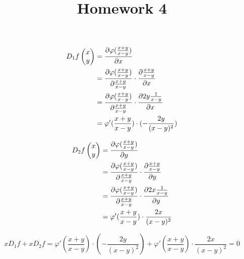 \documentclass{homework}
\title{Homework 4}
\begin{document}
\maketitle

\begin{problem}{1}
\begin{align*}
D_1f\begin{pmatrix}x\\y\end{pmatrix}
&= \frac{\partial \varphi(\frac{x+y}{x-y})}{\partial x} \\
&= \frac{\partial \varphi(\frac{x+y}{x-y})}{\partial \frac{x+y}{x-y}} \cdot \frac{\partial \frac{x+y}{x-y}}{\partial x} \\
&= \frac{\partial \varphi(\frac{x+y}{x-y})}{\partial \frac{x+y}{x-y}} \cdot \frac{\partial 2y\frac{1}{x-y}}{\partial x} \\
&= \varphi'(\frac{x+y}{x-y}) \cdot (- \frac{2y}{(x-y)^2})
\end{align*}

\begin{align*}
D_2f\begin{pmatrix}x\\y\end{pmatrix}
&= \frac{\partial \varphi(\frac{x+y}{x-y})}{\partial y} \\
&= \frac{\partial \varphi(\frac{x+y}{x-y})}{\partial \frac{x+y}{x-y}} \cdot \frac{\partial \frac{x+y}{x-y}}{\partial y} \\
&= \frac{\partial \varphi(\frac{x+y}{x-y})}{\partial \frac{x+y}{x-y}} \cdot \frac{\partial 2x\frac{1}{x-y}}{\partial y} \\
&= \varphi'(\frac{x+y}{x-y}) \cdot \frac{2x}{(x-y)^2}
\end{align*}

$$xD_1f + xD_2f = \varphi'(\frac{x+y}{x-y}) \cdot (- \frac{2y}{(x-y)^2}) + \varphi'(\frac{x+y}{x-y}) \cdot \frac{2x}{(x-y)^2} = 0$$
\end{problem}
\end{document}
